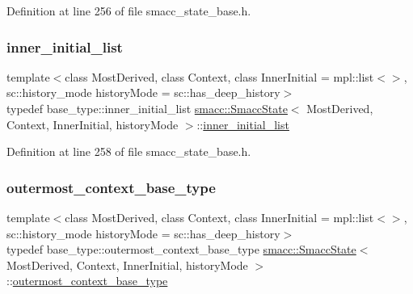 Definition at line 256 of file smacc\+\_\+state\+\_\+base.\+h.

\mbox{\label{classsmacc_1_1SmaccState_acb4ac84bce421d39b594510a6b2df558}} 
\subsubsection{\texorpdfstring{inner\+\_\+initial\+\_\+list}{inner\_initial\_list}}
{\footnotesize\ttfamily template$<$class Most\+Derived, class Context, class Inner\+Initial = mpl\+::list$<$$>$, sc\+::history\+\_\+mode history\+Mode = sc\+::has\+\_\+deep\+\_\+history$>$ \\
typedef base\+\_\+type\+::inner\+\_\+initial\+\_\+list \hyperlink{classsmacc_1_1SmaccState}{smacc\+::\+Smacc\+State}$<$ Most\+Derived, Context, Inner\+Initial, history\+Mode $>$\+::\hyperlink{classsmacc_1_1SmaccState_acb4ac84bce421d39b594510a6b2df558}{inner\+\_\+initial\+\_\+list}}



Definition at line 258 of file smacc\+\_\+state\+\_\+base.\+h.

\mbox{\label{classsmacc_1_1SmaccState_aaf76bbe2aa9dd73e3284605f84ab4b16}} 
\subsubsection{\texorpdfstring{outermost\+\_\+context\+\_\+base\+\_\+type}{outermost\_context\_base\_type}}
{\footnotesize\ttfamily template$<$class Most\+Derived, class Context, class Inner\+Initial = mpl\+::list$<$$>$, sc\+::history\+\_\+mode history\+Mode = sc\+::has\+\_\+deep\+\_\+history$>$ \\
typedef base\+\_\+type\+::outermost\+\_\+context\+\_\+base\+\_\+type \hyperlink{classsmacc_1_1SmaccState}{smacc\+::\+Smacc\+State}$<$ Most\+Derived, Context, Inner\+Initial, history\+Mode $>$\+::\hyperlink{classsmacc_1_1SmaccState_aaf76bbe2aa9dd73e3284605f84ab4b16}{outermost\+\_\+context\+\_\+base\+\_\+type}}



